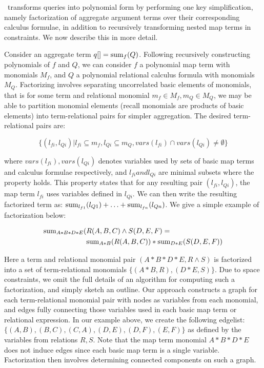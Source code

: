 \compiler\ transforms queries into polynomial form by performing one key
simplification, namely factorization of aggregate argument terms over their
corresponding calculus formulae, in addition to recursively transforming
nested map terms in constraints. We now describe this in more detail.

Consider an aggregate term $q[] = \mathrm{sum}_{f}(Q)$. Following recursively
constructing polynomials of $f$ and $Q$, we can consider $f$ a polynomial map
term with monomials $M_f$, and $Q$ a polynomial relational calculus formula
with monomials $M_Q$. Factorizing involves separating uncorrelated basic
elements of monomials, that is for some term and relational monomial $m_f
\in M_f, m_Q \in M_Q$, we may be able to partition monomial elements (recall
monomials are products of basic elements) into term-relational pairs for simpler
aggregation. The desired term-relational pairs are:

\[\{(l_{fi},l_{Qi}) | l_{fi} \subseteq m_f, l_{Qi} \subseteq m_Q,
vars(l_{fi}) \cap vars(l_{Qi}) \neq \emptyset\}\]

\noindent where $vars(l_{fi}), vars(l_{Qi})$ denotes variables used by sets of basic
map terms and calculus formulae respectively, and $l_{fi} and l_{Qi}$ are minimal
subsets where the property holds. This property states that for any resulting
pair $(l_{fi}, l_{Qi})$, the map term $l_{fi}$ uses variables defined in $l_{Qi}$. We can
then write the resulting factorized term as:
$\mathrm{sum}_{l_{f1}}(l_{Q1}) + \ldots + \mathrm{sum}_{l_{fn}}(l_{Qn})$.
We give a simple example of factorization below:

\begin{align*}
\mathrm{sum}_{A*B*D*E}( & R(A,B,C) \wedge S(D,E,F) =\\
& \mathrm{sum}_{A*B}(R(A,B,C)) * \mathrm{sum}_{D*E}(S(D,E,F))
\end{align*}

Here a term and relational monomial pair $(A*B*D*E, R \wedge S)$ is factorized
into a set of term-relational monomials $\{(A*B,R), (D*E,S)\}$. Due to space
constraints, we omit the full details of an algorithm for computing such a
factorization, and simply sketch an outline. Our approach constructs a graph for
each term-relational monomial pair with nodes as variables from each monomial,
and edges fully connecting those variables used in each basic map term or
relational expression. In our example above, we create the following edgelist:
$\{(A,B), (B,C), (C,A), (D,E), (D,F), (E,F)\}$ as defined by the variables from
relations $R,S$. Note that the map term monomial $A*B*D*E$ does not induce edges
since each basic map term is a single variable. Factorization then involves
determining connected components on such a graph.

